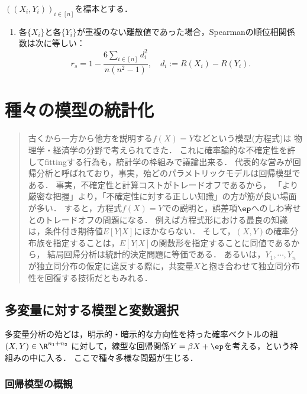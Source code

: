 \documentclass[uplatex,dvipdfmx]{jsreport}
\begin{document}
\begin{lemma}
    $((X_i,Y_i))_{i\in[n]}$を標本とする．
    \begin{enumerate}
        \item 各$\{X_i\}$と各$\{Y_i\}$が重複のない離散値であった場合，Spearmanの順位相関係数は次に等しい：
        \[r_s=1-\frac{6\sum_{i\in[n]}d_i^2}{n(n^2-1)},\quad d_i:=R(X_i)-R(Y_i).\]
    \end{enumerate}
\end{lemma}

\chapter{種々の模型の統計化}

\begin{quotation}
    古くから一方から他方を説明する$f(X)=Y$などという模型(方程式)は
    物理学・経済学の分野で考えられてきた．
    これに確率論的な不確定性を許してfittingする行為も，統計学の枠組みで議論出来る．
    代表的な営みが回帰分析と呼ばれており，事実，殆どのパラメトリックモデルは回帰模型である．
    事実，不確定性と計算コストがトレードオフであるから，
    「より厳密な把握」より，「不確定性に対する正しい知識」の方が筋が良い場面が多い．
    すると，方程式$f(X)=Y$での説明と，誤差項$\ep$へのしわ寄せとのトレードオフの問題になる．
    例えば方程式形における最良の知識は，条件付き期待値$E[Y|X]$にほかならない．
    そして，$(X,Y)$の確率分布族を指定することは，$E[Y|X]$の関数形を指定することに同値であるから，
    結局回帰分析は統計的決定問題に等価である．
    あるいは，$Y_1,\cdots,Y_n$が独立同分布の仮定に違反する際に，共変量$X$と抱き合わせて独立同分布性を回復する技術だともみれる．
\end{quotation}

\section{多変量に対する模型と変数選択}

\begin{tcolorbox}[colframe=ForestGreen, colback=ForestGreen!10!white,breakable,colbacktitle=ForestGreen!40!white,coltitle=black,fonttitle=\bfseries\sffamily,
title=]
    多変量分析の殆どは，明示的・暗示的な方向性を持った確率ベクトルの組$(X,Y)\in\R^{n_1+n_2}$
    に対して，線型な回帰関係$Y=\beta X+\ep$を考える，という枠組みの中に入る．
    ここで種々多様な問題が生じる．
\end{tcolorbox}

\subsection{回帰模型の概観}
\end{document}

